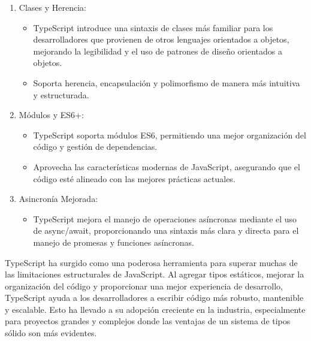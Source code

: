 \documentclass{article}
\begin{document}
\begin{enumerate}
    \item Clases y Herencia:
          \begin{itemize}
              \item TypeScript introduce una sintaxis de clases más familiar para los desarrolladores que provienen
                    de otros lenguajes orientados a objetos, mejorando la legibilidad y el uso de patrones de diseño
                    orientados a objetos.
              \item  Soporta herencia, encapsulación y polimorfismo de manera más intuitiva y estructurada.
          \end{itemize}
    \item Módulos y ES6+:
          \begin{itemize}
              \item TypeScript soporta módulos ES6, permitiendo una mejor organización del código y gestión de
                    dependencias.
              \item Aprovecha las características modernas de JavaScript, asegurando que el código esté alineado con
                    las mejores prácticas actuales.
          \end{itemize}
    \item Asincronía Mejorada:
          \begin{itemize}
              \item TypeScript mejora el manejo de operaciones asíncronas mediante el uso de async/await,
                    proporcionando una sintaxis más clara y directa para el manejo de promesas y funciones asíncronas.
          \end{itemize}
\end{enumerate}

TypeScript ha surgido como una poderosa herramienta para superar muchas de las limitaciones estructurales de 
JavaScript. Al agregar tipos estáticos, mejorar la organización del código y proporcionar una mejor experiencia 
de desarrollo, TypeScript ayuda a los desarrolladores a escribir código más robusto, mantenible y escalable. Esto 
ha llevado a su adopción creciente en la industria, especialmente para proyectos grandes y complejos donde las 
ventajas de un sistema de tipos sólido son más evidentes.
\end{document}
